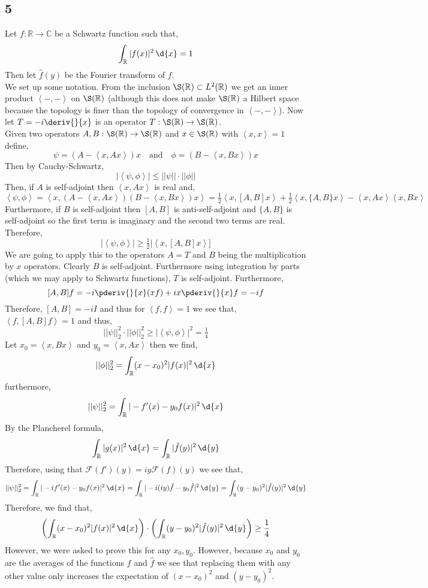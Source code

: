 \documentclass[12pt]{article}
\newcommand{\inner}[2]{\left< #1, #2 \right>}
\newcommand{\R}{\mathbb{R}}
\renewcommand{\C}{\mathbb{C}}
\renewcommand{\F}{\mathcal{F}}
\begin{document}
\subsection{5}

Let $f : \R \to \C$ be a Schwartz function such that,
\[ \int_\R |f(x)|^2 \, \d{x} = 1 \]
Then let $\hat{f}(y)$ be the Fourier transform of $f$. 
\bigskip\\
We set up some notation. From the inclusion $\S(\R) \subset L^2(\R)$ we get an inner product $\inner{-}{-}$ on $\S(\R)$ (although this does not make $\S(\R)$ a Hilbert space because the topology is finer than the topology of convergence in $\inner{-}{-}$). Now let $T = - i \deriv{}{x}$ is an operator $T : \S(\R) \to \S(\R)$. 
\bigskip\\
Given two operators $A,B : \S(\R) \to \S(\R)$ and $x \in \S(\R)$ with $\inner{x}{x} = 1$ define,
\[ \psi = (A - \inner{x}{A x})x \quad \text{and} \quad \phi = (B - \inner{x}{Bx}) x \]
Then by Cauchy-Schwartz,
\[ |\inner{\psi}{\phi}| \le || \psi || \cdot || \phi || \]
Then, if $A$ is self-adjoint then $\inner{x}{Ax}$ is real and,
\[ \inner{\psi}{\phi} = \inner{x}{(A - \inner{x}{Ax})(B - \inner{x}{Bx})x} = \tfrac{1}{2} \inner{x}{[A,B] x} + \tfrac{1}{2} \inner{x}{\{A, B \} x} - \inner{x}{Ax} \inner{x}{Bx}   \]
Furthermore, if $B$ is self-adjoint then $[A, B]$ is anti-self-adjoint and $\{ A , B \}$ is self-adjoint so the first term is imaginary and the second two terms are real. Therefore,
\[ |\inner{\psi}{\phi}| \ge \tfrac{1}{2} | \inner{x}{[A, B] x}] \]
We are going to apply this to the operators $A = T$ and $B$ being the multiplication by $x$ operators. Clearly $B$ is self-adjoint. Furthermore using integration by parts (which we may apply to Schwartz functions), $T$ is self-adjoint. Furthermore, 
\[ [A, B] f = - i \pderiv{}{x} (x f) + i x \pderiv{}{x} f = - i f \]
Therefore, $[A, B] = - i I$ and thus for $\inner{f}{f} = 1$ we see that, $\inner{f}{[A, B] f} = 1$ and thus,
\[ || \psi ||_2^2 \cdot || \phi ||_2^2 \ge | \inner{\psi}{\phi} |^2 = \tfrac{1}{4} \]
Let $x_0 = \inner{x}{B x}$ and $y_0 = \inner{x}{A x}$ then we find,
\[ || \phi ||_2^2 = \int_\R (x - x_0)^2 | f(x) |^2 \, \d{x} \]
furthermore,
\[ || \psi ||_2^2 = \int_\R | - f'(x) - y_0 f(x) |^2 \, \d{x} \]
By the Plancherel formula,
\[ \int_\R |g(x)|^2 \, \d{x} = \int_\R |\hat{f}(y)|^2 \, \d{y} \]
Therefore, using that $\F(f')(y) = iy \F(f)(y)$ we see that,
\[ || \psi ||_2^2 = \int_\R | - i f'(x) - y_0 f(x) |^2 \, \d{x} = \int_\R |-i (i y) \hat{f} - y_0 \hat{f} |^2 \, \d{y} = \int_\R (y - y_0)^2 | \hat{f}(y) |^2 \, \d{y} \]
Therefore, we find that,
\[ \left( \int_\R (x - x_0)^2 |f(x)|^2 \, \d{x} \right) \cdot \left( \int_\R (y - y_0)^2 |\hat{f}(y)|^2 \, \d{y} \right) \ge \frac{1}{4} \]
However, we were asked to prove this for any $x_0, y_0$. However, because $x_0$ and $y_0$ are the averages of the functions $f$ and $\hat{f}$ we see that replacing them with any other value only increases the expectation of $(x - x_0)^2$ and $(y - y_0)^2$.
\end{document}
